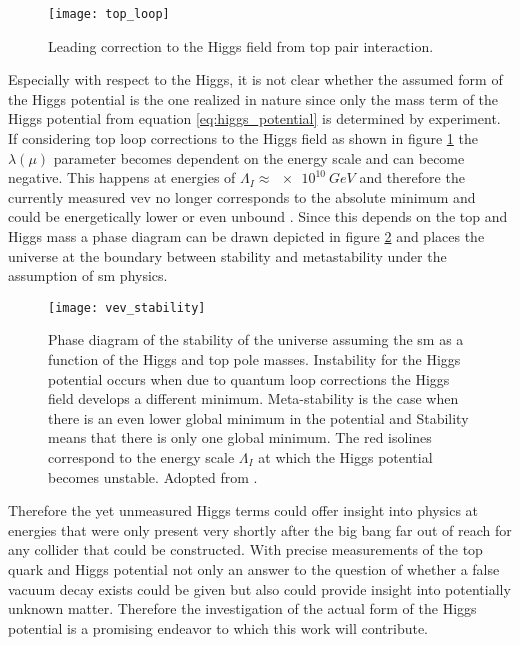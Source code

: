 \begin{figure}
    \centering
    \texttt{[image: top\_loop]}
        \caption[]{Leading correction to the Higgs field from top pair interaction.}
    \label{fig:top_loop}    
\end{figure}
Especially with respect to the Higgs, it is not clear whether the assumed form of the Higgs potential is the one realized in nature since only the mass term of the Higgs potential from equation \ref{eq:higgs_potential} is determined by experiment. If considering top loop corrections to the Higgs field as shown in figure \ref{fig:top_loop} the $\lambda(\mu)$ parameter becomes dependent on the energy scale and can become negative. This happens at energies of $\Lambda_I\approx \qty[]{e10}{GeV}$ and therefore the currently measured \ac{vev} no longer corresponds to the absolute minimum and could be energetically lower or even unbound \citep{devoto2022false}. Since this depends on the top and Higgs mass a phase diagram can be drawn depicted in figure \ref{fig:vev_stability} and places the universe at the boundary between stability and metastability under the assumption of \ac{sm} physics.

\begin{figure}
    \centering
    \texttt{[image: vev\_stability]}
    \caption[]{Phase diagram of the stability of the universe assuming the \ac{sm} as a function of the Higgs and top pole masses. Instability for the Higgs potential occurs when due to quantum loop corrections the Higgs field develops a different minimum. Meta-stability is the case when there is an even lower global minimum in the potential and Stability means that there is only one global minimum. The red isolines correspond to the energy scale $\Lambda_I$ at which the Higgs potential becomes unstable. Adopted from \citep{Buttazzo:2013uya}.} 
    \label{fig:vev_stability}
\end{figure}

Therefore the yet unmeasured Higgs terms could offer insight into physics at energies that were only present very shortly after the big bang far out of reach for any collider that could be constructed. With precise measurements of the top quark and Higgs potential not only an answer to  the question of whether a false vacuum decay exists could be given but also could provide insight into potentially unknown matter. Therefore the investigation of the actual form of the Higgs potential is a promising endeavor to which this work will contribute.

